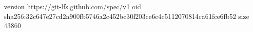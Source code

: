version https://git-lfs.github.com/spec/v1
oid sha256:32c647e27cd2a900fb5746a2c452bc30f203ce6c4c5112070814ca61fce6fb52
size 43860
